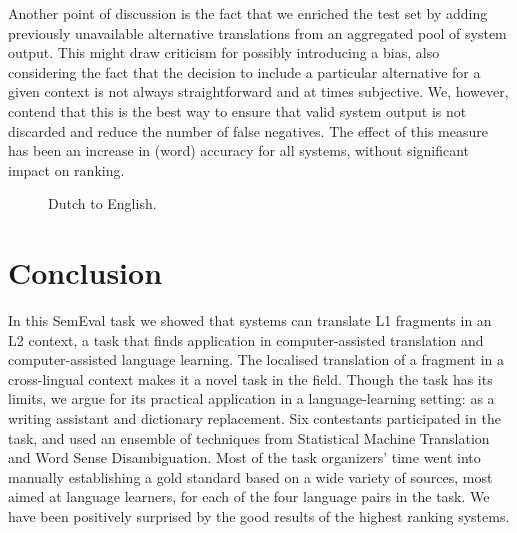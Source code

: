 

Another point of discussion is the fact that we enriched the test set by adding
previously unavailable alternative translations from an aggregated pool of
system output. This might draw criticism for possibly introducing a bias, also
considering the fact that the decision to include a particular alternative for
a given context is not always straightforward and at times subjective. We,
however, contend that this is the best way to ensure that valid system output
is not discarded and reduce the number of false negatives. The effect of this
measure has been an increase in (word) accuracy for all systems, without
significant impact on ranking.


\begin{figure}[bth] %
\noindent{}
\caption{Dutch to English.}
\label{fig:graphs2}
\end{figure}

\section{Conclusion}

In this SemEval task we showed that systems can translate L1 fragments in an L2
context, a task that finds application in computer-assisted translation and
computer-assisted language learning. The localised translation of a fragment in
a cross-lingual context makes it a novel task in the field. Though the task has
its limits, we argue for its practical application in a language-learning
setting: as a writing assistant and dictionary replacement. Six contestants
participated in the task, and used an ensemble of techniques from Statistical
Machine Translation and Word Sense Disambiguation. Most of the task organizers'
time went into manually establishing a gold standard based on a wide variety of
sources, most aimed at language learners, for each of the four language pairs
in the task. We have been positively surprised by the good results of the
highest ranking systems.

